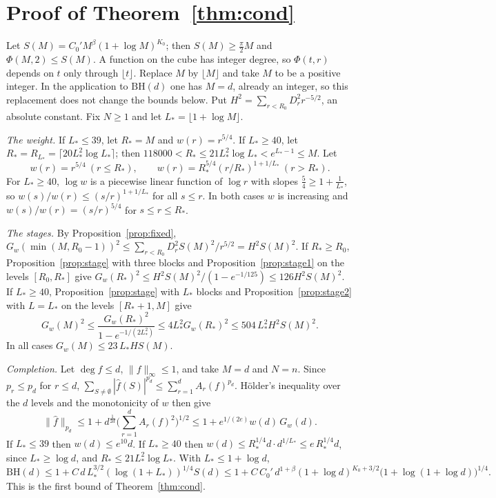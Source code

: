 \documentclass[11pt]{amsart}
\theoremstyle{definition}
\newcommand{\BH}{\mathrm{BH}}
\newcommand{\hf}{\widehat f}
\begin{document}
\section{Proof of Theorem~\ref{thm:cond}}\label{sec:assembly}

Let $S(M)=C_0'M^\beta(1+\log M)^{K_0}$; then $S(M)\ge\frac\pi2M$ and $\Phi(M,2)\le S(M)$. A function on the cube has integer degree, so $\Phi(t,r)$ depends on $t$ only through $\lfloor t\rfloor$. Replace $M$ by $\lfloor M\rfloor$ and take $M$ to be a positive integer. In the application to $\BH(d)$ one has $M=d$, already an integer, so this replacement does not change the bounds below. Put $H^2=\sum_{r<R_0}D_r^2r^{-5/2}$, an absolute constant. Fix $N\ge1$ and let $L_*=\lfloor1+\log M\rfloor$.

\smallskip\noindent\emph{The weight.} If $L_*\le39$, let $R_*=M$ and $w(r)=r^{5/4}$. If $L_*\ge40$, let $R_*=R_{L_*}=\lceil20L_*^2\log L_*\rceil$; then $118000<R_*\le21L_*^2\log L_*<e^{L_*-1}\le M$. Let
\[
w(r)=r^{5/4}\ (r\le R_*),\qquad w(r)=R_*^{5/4}(r/R_*)^{1+1/L_*}\ (r>R_*).
\]
For $L_*\ge40$, $\log w$ is a piecewise linear function of $\log r$ with slopes $\frac54\ge1+\frac1{L_*}$, so $w(s)/w(r)\le(s/r)^{1+1/L_*}$ for all $s\le r$. In both cases $w$ is increasing and $w(s)/w(r)=(s/r)^{5/4}$ for $s\le r\le R_*$.

\smallskip\noindent\emph{The stages.} By Proposition~\ref{prop:fixed}, $G_w(\min(M,R_0-1))^2\le\sum_{r<R_0}D_r^2S(M)^2/r^{5/2}=H^2S(M)^2$. If $R_*\ge R_0$, Proposition~\ref{prop:stage} with three blocks and Proposition~\ref{prop:stage1} on the levels $[R_0,R_*]$ give $G_w(R_*)^2\le H^2S(M)^2/(1-e^{-1/125})\le126H^2S(M)^2$. If $L_*\ge40$, Proposition~\ref{prop:stage} with $L_*$ blocks and Proposition~\ref{prop:stage2} with $L=L_*$ on the levels $[R_*+1,M]$ give
\[
G_w(M)^2\le\frac{G_w(R_*)^2}{1-e^{-1/(2L_*^2)}}\le4L_*^2G_w(R_*)^2\le504\,L_*^2H^2S(M)^2 .
\]
In all cases $G_w(M)\le23\,L_*HS(M)$.

\smallskip\noindent\emph{Completion.} Let $\deg f\le d$, $\|f\|_\infty\le1$, and take $M=d$ and $N=n$. Since $p_r\le p_d$ for $r\le d$, $\sum_{S\ne\emptyset}|\hf(S)|^{p_d}\le\sum_{r=1}^dA_r(f)^{p_d}$. H\"older's inequality over the $d$ levels and the monotonicity of $w$ then give
\[
\|\hf\|_{p_d}\le1+d^{\frac1{2d}}\Big(\sum_{r=1}^dA_r(f)^2\Big)^{1/2}\le1+e^{1/(2e)}w(d)\,G_w(d).
\]
If $L_*\le39$ then $w(d)\le e^{10}d$. If $L_*\ge40$ then $w(d)\le R_*^{1/4}d\cdot d^{1/L_*}\le e\,R_*^{1/4}d$, since $L_*\ge\log d$, and $R_*\le21L_*^2\log L_*$. With $L_*\le1+\log d$,
\[
\BH(d)\le1+C\,d\,L_*^{3/2}(\log(1+L_*))^{1/4}S(d)\le1+C\,C_0'\,d^{1+\beta}(1+\log d)^{K_0+3/2}\big(1+\log(1+\log d)\big)^{1/4}.
\]
This is the first bound of Theorem~\ref{thm:cond}.
\end{document}
